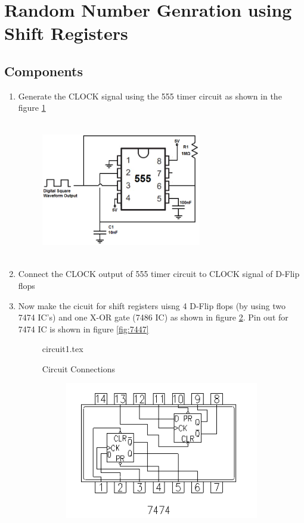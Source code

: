 \documentclass[12pt]{article}
\begin{document}
\section{Random Number Genration using Shift Registers}
\subsection{Components}


\renewcommand{\theequation}{\theenumi}
\renewcommand{\thefigure}{\theenumi}
\begin{enumerate}[label=\thesubsection.\arabic*.,ref=\thesubsection.\theenumi]
\item Generate the CLOCK signal using the 555 timer circuit as shown in the figure \ref{fig:1}
\begin{figure}[h!]
\includegraphics[width=7cm, height=6cm]{figs/555.png}
\label{fig:1}
\end{figure}	
	
\item Connect the CLOCK output of 555 timer circuit to CLOCK signal of D-Flip flops		
\item Now make the cicuit for shift registers uisng 4 D-Flip flops (by using two 7474 IC's) and one X-OR gate (7486 IC) as shown in figure \ref{fig:2}. Pin out for 7474 IC is shown in figure \ref{fig:7447}
\begin{figure}
\centering

{circuit1.tex}
\caption{Circuit Connections}
\label{fig:2}
\end{figure}

\begin{figure}[h!]
\begin{center}

\includegraphics[width=11cm, height=6cm]{figs/IC7474.png}
\label{fig:7474}


\end{center}
\end{figure}
\end{enumerate}
\end{document}
